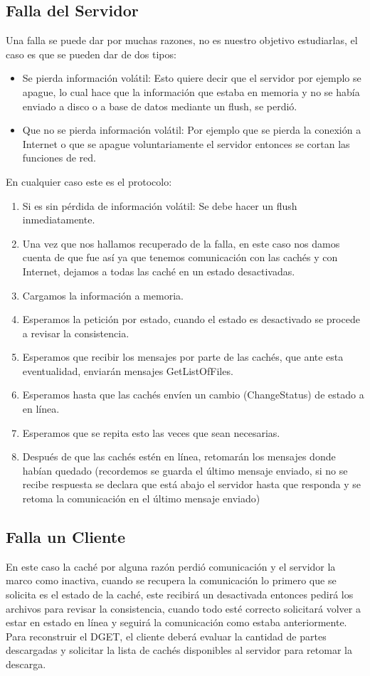 \subsection{Falla del Servidor}
Una falla se puede dar por muchas razones, no es nuestro objetivo estudiarlas, el caso es que se pueden dar de dos tipos:

\begin{itemize}
\item Se pierda información volátil: Esto quiere decir que el servidor por ejemplo se apague, lo cual hace que la información que estaba en memoria y no se había enviado a disco o a base de datos mediante un flush, se perdió.
\item Que no se pierda información volátil: Por ejemplo que se pierda la conexión a Internet o que se apague voluntariamente el servidor entonces se cortan las funciones de red.
\end{itemize}

En cualquier caso este es el protocolo:

\begin{enumerate}
\item Si es sin pérdida de información volátil: Se debe hacer un flush inmediatamente.
\item Una vez que nos hallamos recuperado de la falla, en este caso nos damos cuenta de que fue así ya que tenemos comunicación con las cachés y con Internet, dejamos a todas las caché en un estado desactivadas.
\item Cargamos la información a memoria.
\item Esperamos la petición por estado, cuando el estado es desactivado se procede a revisar la consistencia.
\item Esperamos que recibir los mensajes por parte de las cachés, que ante esta eventualidad, enviarán mensajes GetListOfFiles.
\item Esperamos hasta que las cachés envíen un cambio (ChangeStatus) de estado a en línea.
\item Esperamos que se repita esto las veces que sean necesarias.
\item Después de que las cachés estén en línea, retomarán los mensajes donde habían quedado (recordemos se guarda el último mensaje enviado, si no se recibe respuesta se declara que está abajo el servidor hasta que responda y se retoma la comunicación en el último mensaje enviado)
\end{enumerate}

\subsection{Falla un Cliente}
En este caso la caché por alguna razón perdió comunicación y el servidor la marco como inactiva, cuando se recupera la comunicación lo primero que se solicita es el estado de la caché, este recibirá un desactivada entonces pedirá los archivos para revisar la consistencia, cuando todo esté correcto solicitará volver a estar en estado en línea y seguirá la comunicación como estaba anteriormente.
Para reconstruir el DGET, el cliente deberá evaluar la cantidad de partes descargadas y solicitar la lista de cachés disponibles al servidor para retomar la descarga.

